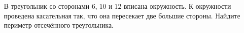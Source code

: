 \begin{ex}
	\begin{condition}
		В треугольник со сторонами \( 6 \), \( 10  \) и \( 12 \) вписана окружность. К окружности проведена касательная так, что она пересекает две большие стороны. Найдите периметр отсечённого треугольника.
	\end{condition}
\end{ex}